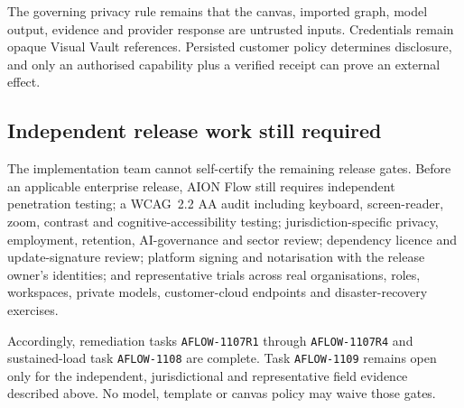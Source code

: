 The governing privacy rule remains that the canvas, imported graph, model output, evidence and
provider response are untrusted inputs. Credentials remain opaque Visual Vault references. Persisted
customer policy determines disclosure, and only an authorised capability plus a verified receipt can
prove an external effect.

\subsection{Independent release work still required}

The implementation team cannot self-certify the remaining release gates. Before an applicable
enterprise release, AION Flow still requires independent penetration testing; a WCAG~2.2 AA audit
including keyboard, screen-reader, zoom, contrast and cognitive-accessibility testing;
jurisdiction-specific privacy, employment, retention, AI-governance and sector review; dependency
licence and update-signature review; platform signing and notarisation with the release owner's
identities; and representative trials across real organisations, roles, workspaces, private models,
customer-cloud endpoints and disaster-recovery exercises.

Accordingly, remediation tasks \texttt{AFLOW-1107R1} through \texttt{AFLOW-1107R4} and sustained-load
task \texttt{AFLOW-1108} are complete. Task \texttt{AFLOW-1109} remains open only for the independent,
jurisdictional and representative field evidence described above. No model, template or canvas policy
may waive those gates.
